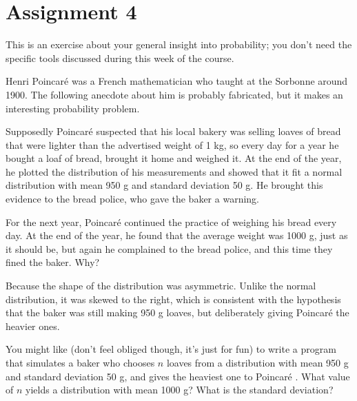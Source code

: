 \documentclass[../../assignments/assignments]{subfiles}
\begin{document}
\section{Assignment 4}



\begin{exercise}
This is an exercise about your general insight into probability; you don't need the specific tools discussed during this week of the course.

Henri Poincar\'{e} was a French mathematician who taught at the Sorbonne around 1900.
The following anecdote about him is probably fabricated, but it makes an interesting probability problem.

Supposedly Poincar\'{e}  suspected that his local bakery was selling loaves of bread that were lighter than the advertised weight of 1 kg, so every day for a year he bought a loaf of bread, brought it home and weighed it.
At the end of the year, he plotted the distribution of his measurements and showed that it fit a normal distribution with mean 950 g and standard deviation 50 g.
He brought this evidence to the bread police, who gave the baker a warning.

For the next year, Poincar\'{e}  continued the practice of weighing his bread every day.
At the end of the year, he found that the average weight was 1000 g, just as it should be, but again he complained to the bread police, and this time they fined the baker.
Why?

\begin{solution}
Because the shape of the distribution was asymmetric. Unlike the normal distribution, it was skewed to the right, which is consistent with the hypothesis that the baker was still making 950 g loaves, but deliberately giving Poincar\'{e}  the heavier ones.

You might like (don't feel obliged though, it's just for fun) to write a program that simulates a baker who chooses $n$ loaves from a distribution with mean 950 g and standard deviation 50 g, and gives the heaviest one to Poincar\'{e} .
What value of $n$ yields a distribution with mean 1000 g?
What is the standard deviation?


\end{solution}
\end{exercise}
\end{document}
